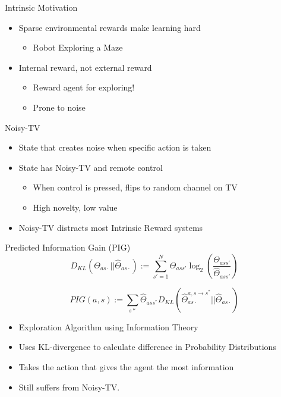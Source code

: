 	
	\begin{frame}[fragile]{Intrinsic Motivation}
		\begin{itemize}
			\item {Sparse environmental rewards make learning hard}
			\begin{itemize}
				\item {Robot Exploring a Maze}
			\end{itemize}
			\item {Internal reward, not external reward}
			\begin{itemize}
				\item {Reward agent for exploring!}
				\item {Prone to noise}
			\end{itemize}
		\end{itemize}
	\end{frame}
	
	
	\begin{frame}[fragile]{Noisy-TV}
		\begin{itemize}
			\item {State that creates noise when specific action is taken}
			\item {State has Noisy-TV and remote control}
			\begin{itemize}
				\item {When control is pressed, flips to random channel on TV}
				\item {High novelty, low value}
			\end{itemize}
			\item {Noisy-TV distracts most Intrinsic Reward systems}
		\end{itemize}
	\end{frame}
	
	
	\begin{frame}[fragile]{Predicted Information Gain (PIG)}
		\[D_{KL} (\Theta_{as\cdot} || \hat{\Theta}_{as\cdot}) := \sum_{s' = 1}^{ N} \Theta_{ass'} \log_{2}(\frac{\Theta_{ass'}}{\hat{\Theta}_{ass'}})   \]
		
		\[ PIG(a,s) := \sum_{s*} \hat{\Theta}_{ass^{*}} D_{KL}(\hat{\Theta}_{as\cdot}^{a,s \rightarrow s^{*}} || \hat{\Theta}_{as\cdot}) \]
		\begin{itemize}
			\item {Exploration Algorithm using Information Theory}
			\item {Uses KL-divergence to calculate difference in Probability Distributions}
			\item {Takes the action that gives the agent the most information}
			\item {Still suffers from Noisy-TV.}
		\end{itemize}
	\end{frame}
	
